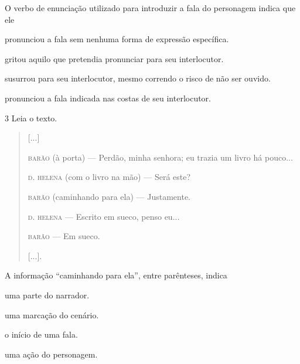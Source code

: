 O verbo de enunciação utilizado para introduzir a fala do personagem indica que ele

\begin{escolha}
\item pronunciou a fala sem nenhuma forma de expressão específica.

\item gritou aquilo que pretendia pronunciar para seu interlocutor.

\item susurrou para seu interlocutor, mesmo correndo o risco de não ser ouvido.

\item pronunciou a fala indicada nas costas de seu interlocutor.
\end{escolha}


\num{3} Leia o texto.

\begin{quote}
{[}...{]}

\textsc{barão} (à porta) — Perdão, minha senhora; eu trazia um livro há
pouco...

\textsc{d. helena} (com o livro na mão) — Será este?

\textsc{barão} (caminhando para ela) — Justamente.

\textsc{d. helena} — Escrito em sueco, penso eu...

\textsc{barão} — Em sueco.

{[}...{]}.
\end{quote}


A informação “caminhando para ela”, entre parênteses, indica

\begin{minipage}{.5\textwidth}
\begin{escolha}
\item uma parte do narrador.

\item uma marcação do cenário.

\item o início de uma fala.

\item uma ação do personagem.
\end{escolha}
\end{minipage}


